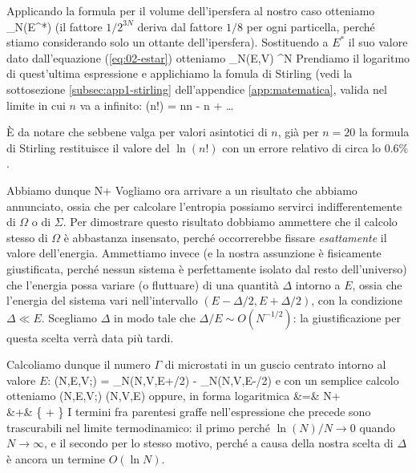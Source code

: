 Applicando la formula per il volume dell'ipersfera al nostro caso otteniamo
\be
\Sigma_{N}(E^{*}) \simeq {}
\ee
(il fattore $1/2^{3N}$ deriva dal fattore $1/8$ per ogni particella, perché stiamo considerando solo un ottante dell'ipersfera). Sostituendo a $E^{*}$ il suo valore dato dall'equazione (\ref{eq:02-estar}) otteniamo
\be
\Sigma_{N}(E,V) \simeq {}^{N}
\ee
Prendiamo il logaritmo di quest'ultima espressione e applichiamo la fomula di Stirling (vedi la sottosezione \ref{subsec:app1-stirling} dell'appendice \ref{app:matematica}, valida nel limite in cui $n$ va a infinito:
\be
\ln(n!) = n\ln n - n + \dots
\ee

\begin{Nota}
\`E da notare che sebbene valga per valori asintotici di $n$, già per $n=20$ la formula di Stirling restituisce il valore del $\ln(n!)$ con un errore relativo di circa lo $0.6\%$.
\end{Nota}

Abbiamo dunque
\be
\ln{} \simeq N\ln{} + 
\ee
Vogliamo ora arrivare a un risultato che abbiamo annunciato, ossia che per calcolare l'entropia possiamo servirci indifferentemente di $\Omega$ o di $\Sigma$. Per dimostrare questo risultato dobbiamo ammettere che il calcolo stesso di $\Omega$ è abbastanza insensato, perché occorrerebbe fissare {\em esattamente} il valore dell'energia. Ammettiamo invece (e la nostra assunzione è fisicamente giustificata, perché nessun sistema è perfettamente isolato dal resto dell'universo) che l'energia possa variare (o fluttuare) di una quantità $\Delta$ intorno a $E$, ossia che l'energia del sistema vari nell'intervallo $(E-\Delta/2,E+\Delta/2)$, con la condizione $\Delta \ll E$. Scegliamo $\Delta$ in modo tale che $\Delta/E \sim O(N^{-1/2})$: la giustificazione per questa scelta verrà data più tardi.

Calcoliamo dunque il numero $\Gamma$ di microstati in un guscio centrato intorno al valore $E$:
\be
\Gamma(N,E,V;\Delta) = \Sigma_{N}(N,V,E+\Delta/2) - \Sigma_{N}(N,V,E-\Delta/2) \simeq {}\Delta
\ee
e con un semplice calcolo otteniamo
\be
\Gamma(N,E,V;\Delta) \simeq {}\Sigma(N,V,E)
\ee
oppure, in forma logaritmica
\bea
{} &=& N\ln{} + \nonumber\\
  &+& \left\{ \ln{} + \ln{}\right\}
\eea
I termini fra parentesi graffe nell'espressione che precede sono trascurabili nel limite termodinamico: il primo perché $\ln(N)/N \to 0$ quando $N\to\infty$, e il secondo per lo stesso motivo, perché a causa della nostra scelta di $\Delta$ è ancora un termine $O(\ln N )$.


